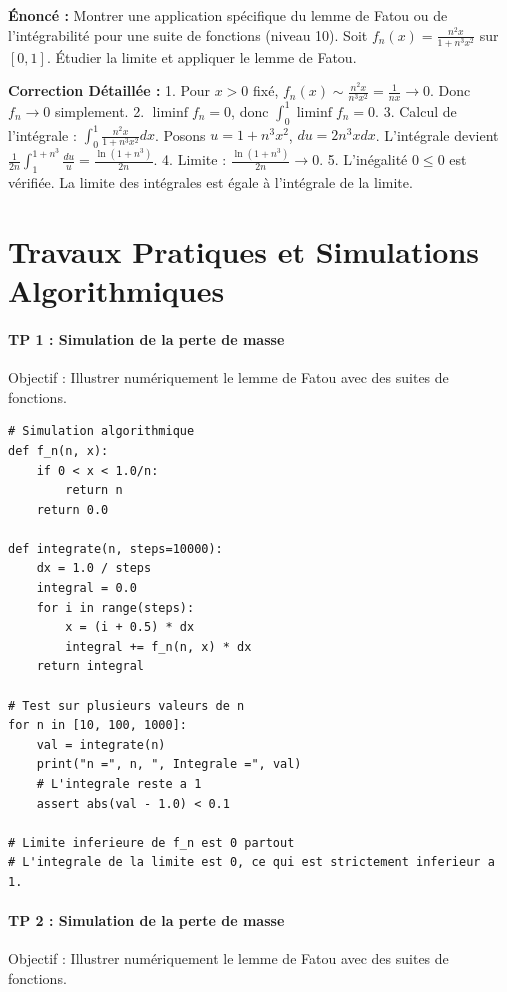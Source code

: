 \documentclass[11pt,a4paper]{article}
\begin{document}
\textbf{Énoncé :}
Montrer une application spécifique du lemme de Fatou ou de l'intégrabilité pour une suite de fonctions (niveau 10).
Soit $f_n(x) = \frac{n^2 x}{1 + n^3 x^2}$ sur $[0, 1]$.
Étudier la limite et appliquer le lemme de Fatou.

\textbf{Correction Détaillée :}
1. Pour $x > 0$ fixé, $f_n(x) \sim \frac{n^2 x}{n^3 x^2} = \frac{1}{n x} \to 0$. Donc $f_n \to 0$ simplement.
2. $\liminf f_n = 0$, donc $\int_0^1 \liminf f_n = 0$.
3. Calcul de l'intégrale : $\int_0^1 \frac{n^2 x}{1 + n^3 x^2} dx$.
   Posons $u = 1 + n^3 x^2$, $du = 2 n^3 x dx$.
   L'intégrale devient $\frac{1}{2n} \int_1^{1+n^3} \frac{du}{u} = \frac{\ln(1+n^3)}{2n}$.
4. Limite : $\frac{\ln(1+n^3)}{2n} \to 0$.
5. L'inégalité $0 \le 0$ est vérifiée. La limite des intégrales est égale à l'intégrale de la limite.


\part{Travaux Pratiques et Simulations Algorithmiques}
\subsection*{TP 1 : Simulation de la perte de masse}
Objectif : Illustrer numériquement le lemme de Fatou avec des suites de fonctions.

\begin{lstlisting}
# Simulation algorithmique
def f_n(n, x):
    if 0 < x < 1.0/n:
        return n
    return 0.0

def integrate(n, steps=10000):
    dx = 1.0 / steps
    integral = 0.0
    for i in range(steps):
        x = (i + 0.5) * dx
        integral += f_n(n, x) * dx
    return integral

# Test sur plusieurs valeurs de n
for n in [10, 100, 1000]:
    val = integrate(n)
    print("n =", n, ", Integrale =", val)
    # L'integrale reste a 1
    assert abs(val - 1.0) < 0.1

# Limite inferieure de f_n est 0 partout
# L'integrale de la limite est 0, ce qui est strictement inferieur a 1.
\end{lstlisting}


\subsection*{TP 2 : Simulation de la perte de masse}
Objectif : Illustrer numériquement le lemme de Fatou avec des suites de fonctions.
\end{document}
